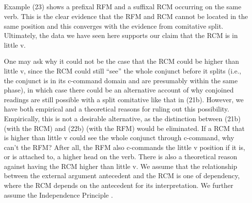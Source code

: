 \documentclass[output=paper]{langsci/langscibook}
\begin{document}
\begin{listWWviiiNumxlileveli}
\item \ea\label{ex:}
\\
\ea\label{ex:}
\\
\ea\label{ex:}
\\
\ea\label{ex:}
\\
\end{listWWviiiNumxlileveli}

Example (23) shows a prefixal RFM and a suffixal RCM occurring on the same verb. This is the clear evidence that the RFM and RCM cannot be located in the same position and this converges with the evidence from comitative split. Ultimately, the data we have seen here supports our claim that the RCM is in little v. 

  One may ask why it could not be the case that the RCM could be higher than little v, since the RCM could still “see” the whole conjunct before it splits (i.e., the conjunct is in its c-command domain and are presumably within the same phase), in which case there could be an alternative account of why conjoined readings are still possible with a split comitative like that in (21b). However, we have both empirical and a theoretical reasons for ruling out this possibility. Empirically, this is not a desirable alternative, as the distinction between (21b) (with the RCM) and (22b) (with the RFM) would be eliminated. If a RCM that is higher than little v could see the whole conjunct through c-command, why can't the RFM? After all, the RFM also c-commands the little v position if it is, or is attached to, a higher head on the verb. There is also a theoretical reason against having the RCM higher than little v. We assume that the relationship between the external argument antecedent and the RCM is one of dependency, where the RCM depends on the antecedent for its interpretation. We further assume the Independence Principle \citep{Safir2004}. 

\begin{listWWviiiNumxlileveli}
\item \ea\label{ex:}
\\
\end{listWWviiiNumxlileveli}
\end{document}
